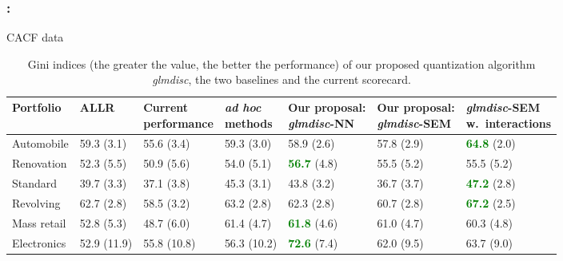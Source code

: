 \documentclass[english,xcolor={rgb,dvipsnames,table,usenames}]{beamer}
\begin{document}
\begin{frame}
\frametitle{\secname : \subsecname}

CACF data

\begin{table}
    \centering
        \caption{Gini indices (the greater the value, the better the performance) of our proposed quantization algorithm \textit{glmdisc}, the two baselines and the current scorecard.}
    \label{tab:real_data_inter}
\begin{tiny}
\begin{tabular}{lllllll}
Portfolio & ALLR & \makecell{Current\\performance} & \makecell{\textit{ad hoc}\\methods} & \makecell{Our proposal:\\ \textit{glmdisc}-NN} & \makecell{Our proposal:\\ \textit{glmdisc}-SEM} & \makecell{\textit{glmdisc}-SEM\\ w.\ interactions} \\
\hline
Automobile & 59.3 (3.1) & 55.6 (3.4) & 59.3 (3.0) & 58.9 (2.6) & 57.8 (2.9) & \textcolor{green}{\bf{64.8}} (2.0) \\
Renovation & 52.3 (5.5) & 50.9 (5.6) & 54.0 (5.1) & \textcolor{green}{\bf{56.7}} (4.8) & 55.5 (5.2) & 55.5 (5.2) \\
Standard & 39.7 (3.3) & 37.1 (3.8) & 45.3 (3.1) & 43.8 (3.2) & 36.7 (3.7) & \textcolor{green}{\bf{47.2}} (2.8) \\
Revolving & 62.7 (2.8) & 58.5 (3.2) & 63.2 (2.8) & 62.3 (2.8) & 60.7 (2.8) & \textcolor{green}{\bf{67.2}} (2.5) \\
Mass retail & 52.8 (5.3) & 48.7 (6.0) & 61.4 (4.7) & \textcolor{green}{\bf{61.8}} (4.6) & 61.0 (4.7) & 60.3 (4.8) \\
Electronics & 52.9 (11.9) & 55.8 (10.8) & 56.3 (10.2)  & \textcolor{green}{\bf{72.6}} (7.4) & 62.0 (9.5) & 63.7 (9.0) \\
\end{tabular}
\end{tiny}
\end{table}

\end{frame}
\end{document}
